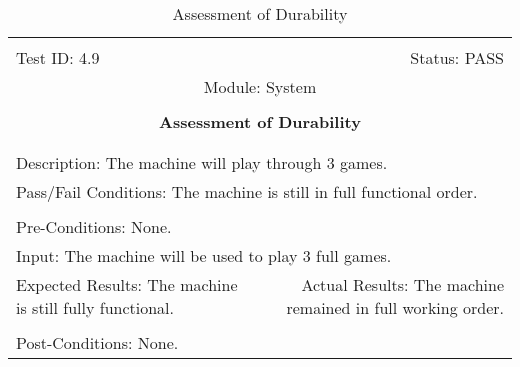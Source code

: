 \documentclass[titlepage]{article}
\begin{document}
\begin{center}
\begin{table}[h!]
\begin{tabular}{|l r|}\hline&\\[-2mm]
	Test ID: 4.9	&Status: PASS\\[-3mm]
	\multicolumn{2}{|c|}{Module: System}\\&\\
	\multicolumn{2}{|c|}{\textbf{\large{Assessment of Durability}}}\\&\\\hline&\\[-3mm]
	\multicolumn{2}{|p{\textwidth}|}{Description: The machine will play through 3 games.}\\\hline
	\multicolumn{2}{|p{\textwidth}|}{Pass/Fail Conditions: The machine is still in full functional order.}\\[1mm]\hline&\\[-3mm]
	\multicolumn{2}{|p{\textwidth}|}{Pre-Conditions: None.}\\[4mm]
	\multicolumn{2}{|p{\textwidth}|}{Input: The machine will be used to play 3 full games.}\\[2mm]\hline
	\multicolumn{1}{|p{0.49\textwidth}}{Expected Results: The machine is still fully functional.}	&\multicolumn{1}{|p{0.45\textwidth}|}{Actual Results: The machine remained in full working order.}\\\hline&\\[-3mm]
	\multicolumn{2}{|p{\textwidth}|}{Post-Conditions: None.}\\\hline
\end{tabular}
\caption{Assessment of Durability}
\end{table}
\end{center}
\end{document}
